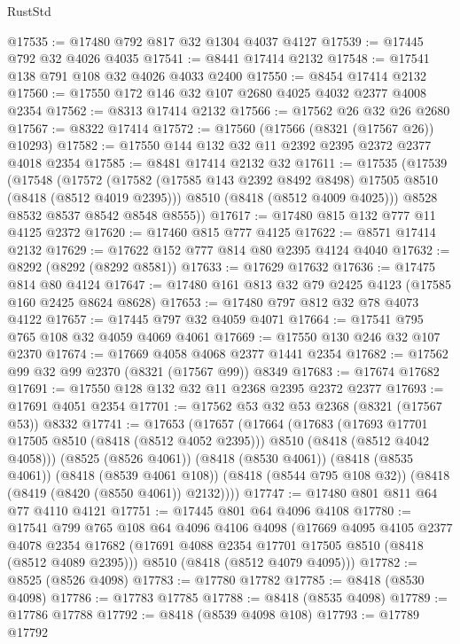 \begin{lexlean}{RustStd}
\begin{coremodule}
@17535 := @17480 @792 @817 @32 @1304 @4037 @4127
@17539 := @17445 @792 @32 @4026 @4035
@17541 := @8441 @17414 @2132
@17548 := @17541 @138 @791 @108 @32 @4026 @4033 @2400
@17550 := @8454 @17414 @2132
@17560 := @17550 @172 @146 @32 @107 @2680 @4025 @4032 @2377 @4008 @2354
@17562 := @8313 @17414 @2132
@17566 := @17562 @26 @32 @26 @2680
@17567 := @8322 @17414
@17572 := @17560 (@17566 (@8321 (@17567 @26)) @10293)
@17582 := @17550 @144 @132 @32 @11 @2392 @2395 @2372 @2377 @4018 @2354
@17585 := @8481 @17414 @2132 @32
@17611 := @17535
    (@17539
      (@17548
        (@17572
          (@17582 (@17585 @143 @2392 @8492 @8498) @17505 @8510 (@8418 (@8512 @4019 @2395)))
          @8510
          (@8418 (@8512 @4009 @4025)))
        @8528
        @8532
        @8537
        @8542
        @8548
        @8555))
@17617 := @17480 @815 @132 @777 @11 @4125 @2372
@17620 := @17460 @815 @777 @4125
@17622 := @8571 @17414 @2132
@17629 := @17622 @152 @777 @814 @80 @2395 @4124 @4040
@17632 := @8292 (@8292 (@8292 @8581))
@17633 := @17629 @17632
@17636 := @17475 @814 @80 @4124
@17647 := @17480 @161 @813 @32 @79 @2425 @4123 (@17585 @160 @2425 @8624 @8628)
@17653 := @17480 @797 @812 @32 @78 @4073 @4122
@17657 := @17445 @797 @32 @4059 @4071
@17664 := @17541 @795 @765 @108 @32 @4059 @4069 @4061
@17669 := @17550 @130 @246 @32 @107 @2370
@17674 := @17669 @4058 @4068 @2377 @1441 @2354
@17682 := @17562 @99 @32 @99 @2370 (@8321 (@17567 @99)) @8349
@17683 := @17674 @17682
@17691 := @17550 @128 @132 @32 @11 @2368 @2395 @2372 @2377
@17693 := @17691 @4051 @2354
@17701 := @17562 @53 @32 @53 @2368 (@8321 (@17567 @53)) @8332
@17741 := @17653
    (@17657
      (@17664
        (@17683
          (@17693 @17701 @17505 @8510 (@8418 (@8512 @4052 @2395)))
          @8510
          (@8418 (@8512 @4042 @4058)))
        (@8525 (@8526 @4061))
        (@8418 (@8530 @4061))
        (@8418 (@8535 @4061))
        (@8418 (@8539 @4061 @108))
        (@8418 (@8544 @795 @108 @32))
        (@8418 (@8419 (@8420 (@8550 @4061)) @2132))))
@17747 := @17480 @801 @811 @64 @77 @4110 @4121
@17751 := @17445 @801 @64 @4096 @4108
@17780 := @17541
    @799
    @765
    @108
    @64
    @4096
    @4106
    @4098
    (@17669
      @4095
      @4105
      @2377
      @4078
      @2354
      @17682
      (@17691 @4088 @2354 @17701 @17505 @8510 (@8418 (@8512 @4089 @2395)))
      @8510
      (@8418 (@8512 @4079 @4095)))
@17782 := @8525 (@8526 @4098)
@17783 := @17780 @17782
@17785 := @8418 (@8530 @4098)
@17786 := @17783 @17785
@17788 := @8418 (@8535 @4098)
@17789 := @17786 @17788
@17792 := @8418 (@8539 @4098 @108)
@17793 := @17789 @17792

\end{coremodule}
\end{lexlean}
